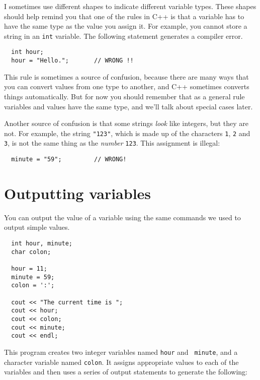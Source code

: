 \vspace{0.1in}
\centerline{}
\vspace{0.1in}

I sometimes use different shapes to indicate different
variable types.  These shapes should help remind you that one of the
rules in C++ is that a variable has to have the same type as the
value you assign it.  For example, you cannot store a string in
an {\tt int} variable.  The following statement generates a compiler
error.

\begin{lstlisting}
  int hour;
  hour = "Hello.";       // WRONG !!
\end{lstlisting}
%
This rule is sometimes a source of confusion, because there are many
ways that you can convert values from one type to another, and C++
sometimes converts things automatically.  But for now you should
remember that as a general rule variables and values have the same
type, and we'll talk about special cases later.

Another source of confusion is that some strings {\em look}
like integers, but they are not.  For example,
the string {\tt "123"}, which is made up of the
characters {\tt 1}, {\tt 2} and {\tt 3}, is not
the same thing as the {\em number} {\tt 123}.
This assignment is illegal:

\begin{lstlisting}
  minute = "59";         // WRONG!
\end{lstlisting}
%
\section{Outputting variables}
\label{output}

You can output the value of a variable using the same commands
we used to output simple values.

\begin{lstlisting}
  int hour, minute;
  char colon;

  hour = 11;
  minute = 59;
  colon = ':';

  cout << "The current time is ";
  cout << hour;
  cout << colon;
  cout << minute;
  cout << endl;
\end{lstlisting}
%
This program creates two integer variables named {\tt hour} and {\tt
minute}, and a character variable named {\tt colon}.  It assigns
appropriate values to each of the variables and then uses a series
of output statements to generate the following:

